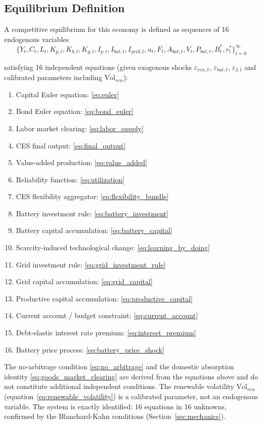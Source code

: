 \documentclass[12pt, a4paper]{article}
\begin{document}
	\subsection{Equilibrium Definition}
	
	A competitive equilibrium for this economy is defined as sequences of 16 endogenous variables
	$$\{Y_t, C_t, L_t, K_{p,t}, K_{b,t}, K_{g,t}, I_{p,t}, I_{bat,t}, I_{grid,t}, u_t, F_t, A_{bat,t}, V_t, P_{bat,t}, B^*_t, r^*_t\}_{t=0}^{\infty}$$
	
	satisfying 16 independent equations (given exogenous shocks $\varepsilon_{ren,t}$, $\varepsilon_{bat,t}$, $\varepsilon_{I,t}$ and calibrated parameters including $\overline{\text{Vol}}_{ren}$):
	
	\begin{enumerate}
		\item Capital Euler equation: \eqref{eq:euler}
		\item Bond Euler equation: \eqref{eq:bond_euler}
		\item Labor market clearing: \eqref{eq:labor_supply}
		\item CES final output: \eqref{eq:final_output}
		\item Value-added production: \eqref{eq:value_added}
		\item Reliability function: \eqref{eq:utilization}
		\item CES flexibility aggregator: \eqref{eq:flexibility_bundle}
		\item Battery investment rule: \eqref{eq:battery_investment}
		\item Battery capital accumulation: \eqref{eq:battery_capital}
		\item Scarcity-induced technological change: \eqref{eq:learning_by_doing}
		\item Grid investment rule: \eqref{eq:grid_investment_rule}
		\item Grid capital accumulation: \eqref{eq:grid_capital}
		\item Productive capital accumulation: \eqref{eq:productive_capital}
		\item Current account / budget constraint: \eqref{eq:current_account}
		\item Debt-elastic interest rate premium: \eqref{eq:interest_premium}
		\item Battery price process: \eqref{eq:battery_price_shock}
	\end{enumerate}
	
	\noindent The no-arbitrage condition \eqref{eq:no_arbitrage} and the domestic absorption identity \eqref{eq:goods_market_clearing} are derived from the equations above and do not constitute additional independent conditions. The renewable volatility $\overline{\text{Vol}}_{ren}$ (equation~\ref{eq:renewable_volatility}) is a calibrated parameter, not an endogenous variable. The system is exactly identified: 16 equations in 16 unknowns, confirmed by the Blanchard-Kahn conditions (Section~\ref{sec:mechanics}).
	
\end{document}
